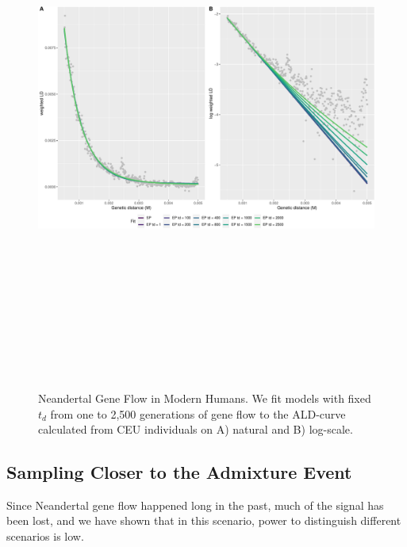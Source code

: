 \documentclass[11pt]{article}
\begin{document}
\begin{figure}
\centering
\includegraphics[width=16cm,height=18cm,keepaspectratio]{Fig_5_MBE-21-0164_R1_Peter_Iasi.pdf}
\caption{\label{fig:fig5} Neandertal Gene Flow in Modern Humans. We fit models with fixed $t_d$ from one to 2,500 generations of gene flow to the ALD-curve calculated from  CEU individuals on A) natural and B) log-scale.}
\end{figure}

\subsection{Sampling Closer to the Admixture Event}\label{estimating the Lomax-parameters under different conditions}

Since Neandertal gene flow happened long in the past, much of the signal has been lost, and we have shown that in this scenario, power to distinguish different scenarios is low.
\end{document}
